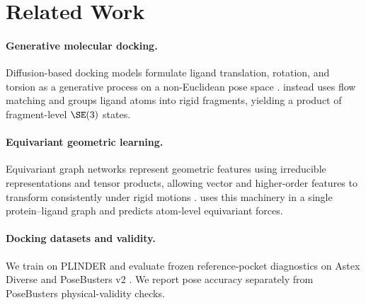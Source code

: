 \section{Related Work}
\label{sec:related}

\paragraph{Generative molecular docking.}
Diffusion-based docking models formulate ligand translation, rotation, and
torsion as a generative process on a non-Euclidean pose space
\citep{corso2023diffdock}. \method instead uses flow matching
\citep{lipman2023flow} and groups ligand atoms into rigid fragments, yielding a
product of fragment-level \(\SE(3)\) states.

\paragraph{Equivariant geometric learning.}
Equivariant graph networks represent geometric features using irreducible
representations and tensor products, allowing vector and higher-order features
to transform consistently under rigid motions
\citep{liao2023equiformer}. \method uses this machinery in a single
protein--ligand graph and predicts atom-level equivariant forces.

\paragraph{Docking datasets and validity.}
We train on PLINDER \citep{durairaj2024plinder} and evaluate frozen
reference-pocket diagnostics on Astex Diverse \citep{hartshorn2007astex} and
PoseBusters v2 \citep{buttenschoen2024posebusters}. We report pose accuracy
separately from PoseBusters physical-validity checks.

